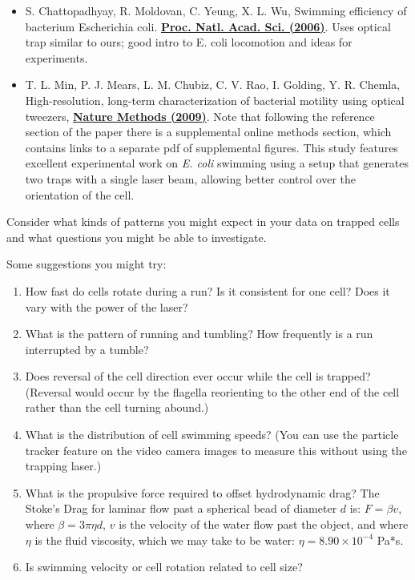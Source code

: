 \documentclass{../lab}
\begin{document}
\begin{itemize}
    \item S. Chattopadhyay, R. Moldovan, C. Yeung, X. L. Wu, Swimming efficiency of bacterium Escherichia coli. \href{http://physics111.lib.berkeley.edu/Physics111/Reprints/OTZ/swimmingefficiency.pdf}{\textbf{Proc. Natl. Acad. Sci. (2006)}}. Uses optical trap similar to ours; good intro to E. coli locomotion and ideas for experiments.

    \item T. L. Min, P. J. Mears, L. M. Chubiz, C. V. Rao, I. Golding, Y. R. Chemla, High-resolution, long-term characterization of bacterial motility using optical tweezers, \href{http://physics111.lib.berkeley.edu/Physics111/Reprints/OTZ/bacterialmotility.pdf}{\textbf{Nature Methods (2009)}}. Note that following the reference section of the paper there is a supplemental online methods section, which contains links to a separate pdf of supplemental figures. This study features excellent experimental work on \emph{E. coli} swimming using a setup that generates two traps with a single laser beam, allowing better control over the orientation of the cell.
\end{itemize}

Consider what kinds of patterns you might expect in your data on trapped cells and what questions you might be able to investigate.

Some suggestions you might try:

\begin{enumerate}
    \item How fast do cells rotate during a run? Is it consistent for one cell? Does it vary with the power of the laser?

    \item What is the pattern of running and tumbling? How frequently is a run interrupted by a tumble?

    \item Does reversal of the cell direction ever occur while the cell is trapped? (Reversal would occur by the flagella reorienting to the other end of the cell rather than the cell turning abound.)

    \item What is the distribution of cell swimming speeds? (You can use the particle tracker feature on the video camera images to measure this without using the trapping laser.)

    \item What is the propulsive force required to offset hydrodynamic drag? The Stoke's Drag for laminar flow past a spherical bead of diameter $d$ is: $F = \beta v$, where $\beta = 3\pi\eta d$, $v$ is the velocity of the water flow past the object, and where $\eta$ is the fluid viscosity, which we may take to be water: $\eta = 8.90 \times 10^{-4}$ Pa*s.

    \item Is swimming velocity or cell rotation related to cell size?

\end{enumerate}
\end{document}
